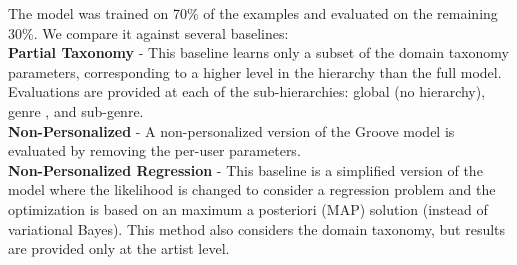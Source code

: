 
The model was trained on 70\% of the examples and evaluated on the remaining 30\%. 
We compare it against several baselines:\\
{\bf Partial Taxonomy} - This baseline  learns only a subset of the domain taxonomy parameters, corresponding to a higher level in the hierarchy than the full model. Evaluations are provided at each of the sub-hierarchies: global (no hierarchy), genre , and sub-genre.\\
{\bf Non-Personalized} - A non-personalized version of the Groove model is evaluated by removing the per-user parameters.\\ %
{\bf Non-Personalized Regression} - This baseline is a simplified version of the model where the likelihood is changed to consider a regression problem and the optimization is based on an maximum a posteriori (MAP) solution (instead of variational Bayes). This method also considers the domain taxonomy, but results are provided only at the artist level. 





